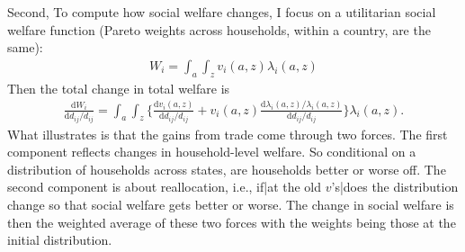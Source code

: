 \documentclass[12pt,pdftex]{article}
\begin{document}
\begin{onehalfspacing}
Second, To compute how social welfare changes, I focus on a utilitarian social welfare function (Pareto weights across households, within a country, are the same):
\begin{align}
W_{i} = \int_{a}\int_{z}  v_{i}(a,z)\lambda_{i}(a,z)
\label{eq:apx-social-welfare}
\end{align}
Then the total change in total welfare is
\begin{align}
\frac{\mathrm{d} W_{i}}{\mathrm{d} d_{ij} / d_{ij}} = \int_{a}\int_{z}  \bigg \{ \frac{\mathrm{d} v_i(a, z)}{\mathrm{d} d_{ij} / d_{ij}}  + v_{i}(a,z) \frac{\mathrm{d} \lambda_{i}(a,z)/ \lambda_{i}(a,z)}{\mathrm{d} d_{ij} / d_{ij}}  \bigg \} \lambda_{i}(a,z).
\label{eq:apx-social-welfare-change}
\end{align}
What illustrates is that the gains from trade come through two forces. The first component reflects changes in household-level welfare. So conditional on a distribution of households across states, are households better or worse off. The second component is about reallocation, i.e., if|at the old $v$'s|does the distribution change so that social welfare gets better or worse. The change in social welfare is then the weighted average of these two forces with the weights being those at the initial distribution.


\end{onehalfspacing}
\end{document}
